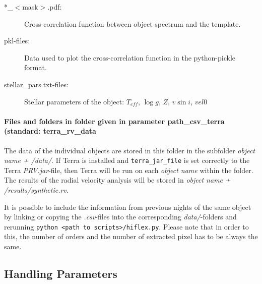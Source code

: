 \documentclass[10pt,a4paper]{article}
\begin{document}
\begin{description}
  \item[*\_$<$mask$>$.pdf:] Cross-correlation function between object spectrum and the template.
  \item[pkl-files:] Data used to plot the cross-correlation function in the python-pickle format.
  \item[stellar\_pars.txt-files:] Stellar parameters of the object: $T_{eff}$, $\log g$, $Z$, $v\sin i$, $vel0$
\end{description}

\paragraph{Files and folders in folder given in parameter path\_csv\_terra (standard: terra\_rv\_data}
\label{Section:files_folders_csv_for_terra}
The data of the individual objects are stored in this folder in the subfolder \textit{object name + /data/}. If Terra is installed and \verb|terra_jar_file| is set correctly to the Terra \textit{PRV.jar}-file, then Terra will be run on each \textit{object name} within the folder. The results of the radial velocity analysis will be stored in \textit{object name + /results/synthetic.rv}.

It is possible to include the information from previous nights of the same object by linking or copying the \textit{.csv}-files into the corresponding \textit{data/}-folders and rerunning \verb|python <path to scripts>/hiflex.py|. Please note that in order to this, the number of orders and the number of extracted pixel has to be always the same.



\subsection{Handling Parameters}
\end{document}
